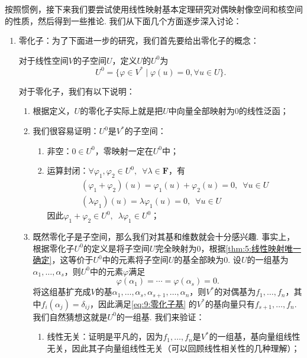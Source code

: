 按照惯例，接下来我们要尝试使用线性映射基本定理研究对偶映射像空间和核空间的性质，然后得到一些推论. 我们从下面几个方面逐步深入讨论：
\begin{enumerate}
    \item 零化子：为了下面进一步的研究，我们首先要给出零化子的概念：
          \begin{definition}
              对于线性空间$V$的子空间$U$，定义$U$的$U^0$为
              \[U^0=\{\varphi\in V^*\mid\varphi(u)=0,\forall u\in U\}.\]
          \end{definition}

          对于零化子，我们有以下说明：
          \begin{enumerate}
              \item 根据定义，$U$的零化子实际上就是把$U$中向量全部映射为0的线性泛函；

              \item 我们很容易证明：$U^0$是$V^*$的子空间：
                    \begin{enumerate}
                        \item 非空：$0\in U^0$，零映射一定在$U^0$中；

                        \item 运算封闭：$\forall\varphi_1,\varphi_2\in U^0,\enspace \forall\lambda\in\mathbf{F}$，有
                              \begin{gather*}
                                  (\varphi_1+\varphi_2)(u)=\varphi_1(u)+\varphi_2(u)=0,\enspace\forall u\in U \\
                                  (\lambda\varphi_1)(u)=\lambda\varphi_1(u)=0,\enspace\forall u\in U
                              \end{gather*}
                              因此$\varphi_1+\varphi_2\in U^0,\enspace \lambda\varphi_1\in U^0$；
                    \end{enumerate}

              \item 既然零化子是子空间，那么我们对其基和维数就会十分感兴趣. 事实上，根据零化子$U^0$的定义是将子空间$U$完全映射为0，根据\autoref{thm:5:线性映射唯一确定}，这等价于$U^0$中的元素将子空间$U$的基全部映为0. 设$U$的一组基为$\alpha_1,\ldots,\alpha_s$，则$U^0$中的元素$\varphi$满足
                    \begin{equation}\label{eq:9:零化子基}
                        \varphi(\alpha_1)=\cdots=\varphi(\alpha_s)=0.
                    \end{equation}
                    将这组基扩充成$V$的基$\alpha_1,\ldots,\alpha_s,\alpha_{s+1},\ldots,\alpha_n$，则$V^*$的对偶基为$f_1,\ldots,f_n$，其中$f_i(\alpha_j)=\delta_{ij}$，因此满足\autoref{eq:9:零化子基} 的$V^*$的基向量只有$f_{s+1},\ldots,f_n$. 我们自然猜想这就是$U^0$的一组基. 我们来验证：
                    \begin{enumerate}
                        \item 线性无关：证明是平凡的，因为$f_1,\ldots,f_n$是$V^*$的一组基，基向量组线性无关，因此其子向量组线性无关（可以回顾线性相关性的几种理解）；


\end{enumerate}
\end{enumerate}
\end{enumerate}
